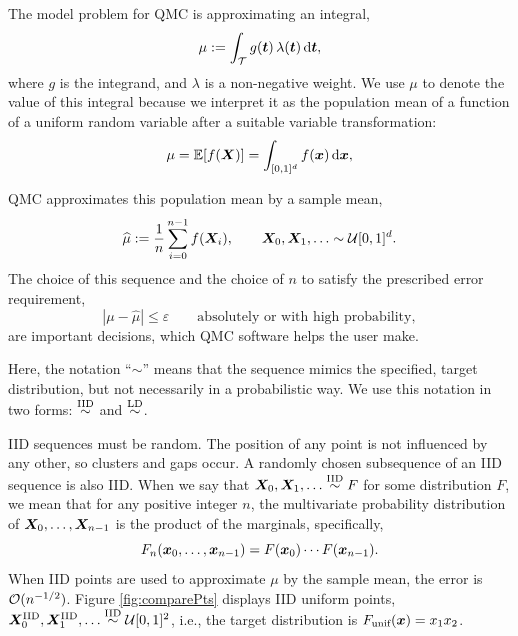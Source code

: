\documentclass[graybox,footinfo]{svmult}
\newcommand{\QMCPYabs}[1]{\ensuremath{{\left \lvert #1 \right \rvert}}}
\newcommand{\hmu}{\widehat{\mu}}
\newcommand{\IID}{\textup{IID}}
\newcommand{\LD}{\textup{LD}}
\newcommand{\unif}{\textup{unif}}
\newcommand{\IIDsim}{\overset{\IID}{\sim}}
\newcommand{\LDsim}{\overset{\LD}{\sim}}
\newcommand{\cube}{[0,1]^d}
\begin{document}
The model problem for QMC is approximating an integral,
\begin{equation} \label{eq:integral}
	\mu := \int_\calT g(\bst) \, \lambda(\bst) \, \D \bst,
\end{equation}
where $g$ is the integrand, and $\lambda$ is a non-negative weight.  We use $\mu$ to denote the value of this integral because we interpret it as the population mean of a function of a uniform random variable after a suitable variable transformation:
\begin{equation} \label{eq:fintegral}
	\mu = \bbE[f(\bsX)] =  \int_{\cube}  f(\bsx) \,  \D \bsx ,
\end{equation}

QMC approximates this population mean by a sample mean,
\begin{equation} \label{eq:samplemean}
	\hmu := \frac 1n \sum_{i=0}^{n-1} f(\bsX_i), \qquad \bsX_0, \bsX_1, \ldots \sim \calU\cube.
\end{equation}
The choice of this sequence and the choice of $n$ to satisfy  the prescribed error requirement,
\begin{equation} \label{eq:err_req}
	\QMCPYabs{\mu - \hmu} \le \varepsilon \qquad \text{absolutely or with high probability},
\end{equation} 
are important decisions, which  QMC software helps the user make.

Here, the notation ``$\sim$'' means that the sequence mimics the specified, target distribution, but not necessarily in a probabilistic way.  We  use this notation in two forms:  $\IIDsim$ and $\LDsim$.

IID sequences must be random. The position of any point is not influenced by any other, so clusters and gaps occur.  A randomly chosen subsequence of an IID sequence is also IID.  When we say that $\bsX_0, \bsX_1, \ldots \IIDsim F$ for some distribution $F$, we mean that for any positive integer $n$, the  multivariate probability distribution of ${\boldsymbol{X}}_0, \ldots, {\boldsymbol{X}}_{n-1}$ is the product of the marginals, specifically,
\begin{equation*}
	F_{n}({\boldsymbol{x}}_0, \ldots, {\boldsymbol{x}}_{n-1}) = F({\boldsymbol{x}}_0) \cdots  F({\boldsymbol{x}}_{n-1}).
\end{equation*}
When IID points are used to approximate $\mu$ by the sample mean, the error is ${\mathcal{O}}(n^{-1/2})$.  Figure \ref{fig:comparePts} displays IID uniform points, $\bsX^{\IID}_0, \bsX^{\IID}_1, \ldots \IIDsim \calU[0,1]^2$, i.e.,  the target distribution is $F_\unif(\bsx) = x_1 x_2$.
\end{document}
